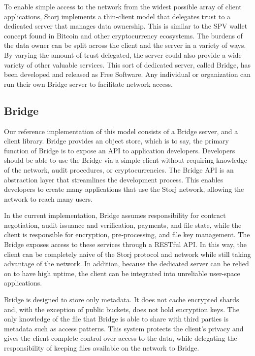 \documentclass[a4paper,10pt]{article}
\begin{document}
To enable simple access to the network from the widest possible array of client
applications, Storj implements a thin-client model that delegates trust to a
dedicated server that manages data ownership. This is similar to the SPV wallet
concept found in Bitcoin and other cryptocurrency ecosystems. The burdens of the
data owner can be split across the client and the server in a variety of ways.
By varying the amount of trust delegated, the server could also provide a wide
variety of other valuable services. This sort of dedicated server, called
Bridge, has been developed and released as Free Software. Any individual or
organization can run their own Bridge server to facilitate network access.

\subsection{Bridge}
Our reference implementation of this model consists of a Bridge server, and a
client library. Bridge provides an object store, which is to say, the primary
function of Bridge is to expose an API to application developers. Developers
should be able to use the Bridge via a simple client without requiring knowledge
of the network, audit procedures, or cryptocurrencies. The Bridge API is an
abstraction layer that streamlines the development process. This enables
developers to create many applications that use the Storj network, allowing the
network to reach many users.

In the current implementation, Bridge assumes responsibility for contract
negotiation, audit issuance and verification, payments, and file state, while
the client is responsible for encryption, pre-processing, and file key
management. The Bridge exposes access to these services through a RESTful API.
In this way, the client can be completely naive of the Storj protocol and
network while still taking advantage of the network. In addition, because the
dedicated server can be relied on to have high uptime, the client can be
integrated into unreliable user-space applications.

Bridge is designed to store only metadata. It does not cache encrypted shards
and, with the exception of public buckets, does not hold encryption keys. The
only knowledge of the file that Bridge is able to share with third parties is
metadata such as access patterns. This system protects the client's privacy and
gives the client complete control over access to the data, while delegating the
responsibility of keeping files available on the network to Bridge.
\end{document}
